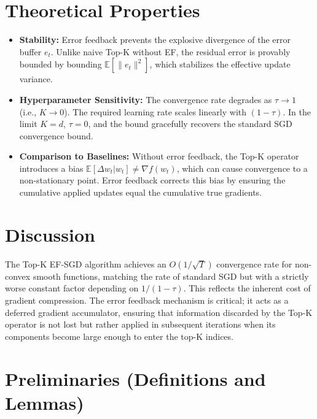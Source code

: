\documentclass{article}
\newcommand{\E}{\mathbb{E}}
\begin{document}
\section*{Theoretical Properties}
\begin{itemize}
    \item \textbf{Stability:} Error feedback prevents the explosive divergence of the error buffer $e_t$. Unlike naive Top-K without EF, the residual error is provably bounded by bounding $\E[\|e_t\|^2]$, which stabilizes the effective update variance.
    \item \textbf{Hyperparameter Sensitivity:} The convergence rate degrades as $\tau \to 1$ (i.e., $K \to 0$). The required learning rate scales linearly with $(1-\tau)$. In the limit $K=d$, $\tau=0$, and the bound gracefully recovers the standard SGD convergence bound.
    \item \textbf{Comparison to Baselines:} Without error feedback, the Top-K operator introduces a bias $\E[\Delta w_t | w_t] \neq \nabla f(w_t)$, which can cause convergence to a non-stationary point. Error feedback corrects this bias by ensuring the cumulative applied updates equal the cumulative true gradients.
\end{itemize}

\section*{Discussion}
The Top-K EF-SGD algorithm achieves an $O(1/\sqrt{T})$ convergence rate for non-convex smooth functions, matching the rate of standard SGD but with a strictly worse constant factor depending on $1/(1-\tau)$. This reflects the inherent cost of gradient compression. The error feedback mechanism is critical; it acts as a deferred gradient accumulator, ensuring that information discarded by the Top-K operator is not lost but rather applied in subsequent iterations when its components become large enough to enter the top-K indices.

\newpage
\section*{Preliminaries (Definitions and Lemmas)}
\end{document}
